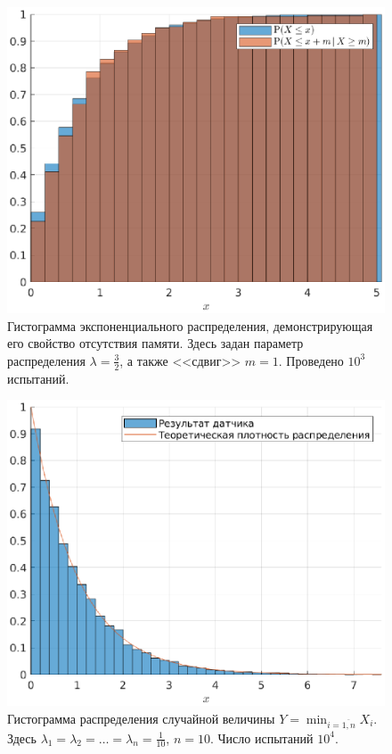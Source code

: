 \begin{figure}[h]
        \includegraphics[width=\linewidth]{task_03/mem2-1000-1.eps}
        \caption{Гистограмма экспоненциального распределения, демонстрирующая его свойство отсутствия памяти. Здесь задан параметр распределения $\lambda = \frac{3}{2}$, а также <<сдвиг>> $m = 1$. Проведено $10^3$ испытаний.}
\end{figure}
\begin{figure}[h]
        \includegraphics[width=\linewidth]{task_03/min-01-10-10000.eps}
        \caption{Гистограмма распределения случайной величины $Y = \min_{i = \overline{1, n}} X_i$. Здесь $\lambda_1 = \lambda_2 = \ldots = \lambda_n = \frac{1}{10}$, $n = 10$. Число испытаний $10^4$.}
\end{figure}
